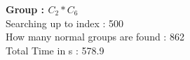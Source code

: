 \textbf{Group : $C_2*C_6$}\\
Searching up to index : 500\\
How many normal groups are found : 862\\
Total Time in s : 578.9\\
